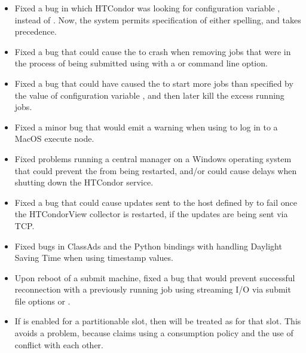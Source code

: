 \begin{itemize}

\item Fixed a bug in which HTCondor was looking for configuration variable
, instead of .
Now, the system permits specification of either spelling,
and  takes precedence.

\item Fixed a bug that could cause the  to crash
when removing jobs that were in the process of being submitted
using  with a  or  
command line option.

\item Fixed a bug that could have caused the  to start more 
jobs than specified by the value of configuration variable 
,
and then later kill the excess running jobs.

\item Fixed a minor bug that would emit a  warning
when using  to log in to a MacOS execute node.
 
\item Fixed problems running a central manager on a Windows operating
system that could prevent the  from being restarted,
and/or could cause delays when shutting down the HTCondor service.

\item Fixed a bug that could cause updates sent to
the host defined by  
to fail once the HTCondorView collector is restarted,
if the updates are being sent via TCP.

\item Fixed bugs in ClassAds and the Python bindings with handling
Daylight Saving Time when using timestamp values.

\item Upon reboot of a submit machine, fixed a bug that would 
	prevent successful reconnection with
	a previously running job 
	using streaming I/O via submit file
	options  or .

\item If  is enabled for a partitionable slot,
then  will be treated as
 for that slot.
This avoids a problem, because claims using a consumption policy
and the use of  conflict
with each other.


\end{itemize}
